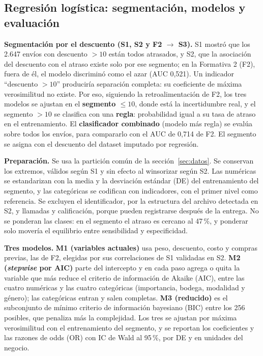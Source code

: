 \documentclass[11pt,a4paper]{article}
\begin{document}
\subsection{Regresión logística: segmentación, modelos y evaluación}\label{sec:met-modelos}
\textbf{Segmentación por el descuento (S1, S2 y F2 $\to$ S3).} S1 mostró que los 2.647 envíos con descuento $> 10$ están todos atrasados, y S2, que la asociación del descuento con el atraso existe solo por ese segmento; en la Formativa 2 (F2), fuera de él, el modelo discriminó como el azar (AUC 0,521). Un indicador ``descuento $> 10$'' produciría separación completa: su coeficiente de máxima verosimilitud no existe. Por eso, siguiendo la retroalimentación de F2, los tres modelos se ajustan en el \textbf{segmento $\le 10$}, donde está la incertidumbre real, y el segmento $> 10$ se clasifica con una \textbf{regla}: probabilidad igual a su tasa de atraso en el entrenamiento. El \textbf{clasificador combinado} (modelo más regla) se evalúa sobre todos los envíos, para compararlo con el AUC de 0,714 de F2. El segmento se asigna con el descuento del dataset imputado por regresión.

\textbf{Preparación.} Se usa la partición común de la sección~\ref{sec:datos}. Se conservan los extremos, válidos según S1 y sin efecto al winsorizar según S2. Las numéricas se estandarizan con la media y la desviación estándar (DE) del entrenamiento del segmento, y las categóricas se codifican con indicadores, con el primer nivel como referencia. Se excluyen el identificador, por la estructura del archivo detectada en S2, y llamadas y calificación, porque pueden registrarse después de la entrega. No se ponderan las clases: en el segmento el atraso es cercano al 47\,\%, y ponderar solo movería el equilibrio entre sensibilidad y especificidad.

\textbf{Tres modelos.} \textbf{M1 (variables actuales)} usa peso, descuento, costo y compras previas, las de F2, elegidas por sus correlaciones de S1 validadas en S2. \textbf{M2 (\emph{stepwise} por AIC)} parte del intercepto y en cada paso agrega o quita la variable que más reduce el criterio de información de Akaike (AIC), entre las cuatro numéricas y las cuatro categóricas (importancia, bodega, modalidad y género); las categóricas entran y salen completas. \textbf{M3 (reducido)} es el subconjunto de mínimo criterio de información bayesiano (BIC) entre los 256 posibles, que penaliza más la complejidad. Los tres se ajustan por máxima verosimilitud con el entrenamiento del segmento, y se reportan los coeficientes y las razones de odds (OR) con IC de Wald al 95\,\%, por DE y en unidades del negocio.
\end{document}

